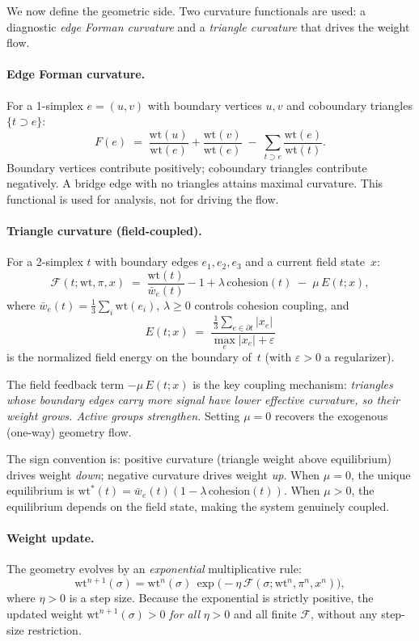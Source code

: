 \documentclass[11pt]{article}
\newcommand{\wt}{\mathrm{wt}}
\newcommand{\Flow}{\mathcal{F}}
\begin{document}
We now define the geometric side.  Two curvature functionals are used: a diagnostic \emph{edge Forman curvature} and a \emph{triangle curvature} that drives the weight flow.

\paragraph{Edge Forman curvature.}
For a 1-simplex $e=(u,v)$ with boundary vertices $u,v$ and coboundary triangles $\{t\supset e\}$:
\begin{equation}\label{eq:edge-forman}
  F(e) \;=\; \frac{\wt(u)}{\wt(e)}+\frac{\wt(v)}{\wt(e)}
         \;-\;\sum_{t\supset e}\frac{\wt(e)}{\wt(t)}.
\end{equation}
Boundary vertices contribute positively; coboundary triangles contribute negatively.  A bridge edge with no triangles attains maximal curvature.  This functional is used for analysis, not for driving the flow.

\paragraph{Triangle curvature (field-coupled).}
For a 2-simplex $t$ with boundary edges $e_1,e_2,e_3$ and a current field state~$x$:
\begin{equation}\label{eq:tri-curv}
  \Flow(t;\wt,\pi,x)
    \;=\; \frac{\wt(t)}{\bar w_e(t)} - 1 + \lambda\,\mathrm{cohesion}(t)
          \;-\;\mu\,E(t;x),
\end{equation}
where $\bar w_e(t)=\tfrac{1}{3}\sum_{i}\wt(e_i)$, $\lambda\ge 0$ controls cohesion coupling, and
\[
  E(t;x) \;=\; \frac{\tfrac{1}{3}\sum_{e\in\partial t}|x_e|}{\max_e|x_e|+\varepsilon}
\]
is the normalized field energy on the boundary of~$t$ (with $\varepsilon>0$ a regularizer).

The field feedback term $-\mu\,E(t;x)$ is the key coupling mechanism: \emph{triangles whose boundary edges carry more signal have lower effective curvature, so their weight grows.  Active groups strengthen.}  Setting $\mu=0$ recovers the exogenous (one-way) geometry flow.

The sign convention is: positive curvature (triangle weight above equilibrium) drives weight \emph{down}; negative curvature drives weight \emph{up}.  When $\mu=0$, the unique equilibrium is $\wt^\ast(t) = \bar w_e(t)(1-\lambda\,\mathrm{cohesion}(t))$.  When $\mu>0$, the equilibrium depends on the field state, making the system genuinely coupled.

\paragraph{Weight update.}
The geometry evolves by an \emph{exponential} multiplicative rule:
\begin{equation}
\wt^{n+1}(\sigma)=\wt^n(\sigma)\,\exp\!\bigl(-\eta \,\Flow(\sigma;\wt^n,\pi^n,x^n)\bigr),
\label{eq:weightupdate}
\end{equation}
where $\eta>0$ is a step size.  Because the exponential is strictly positive, the updated weight $\wt^{n+1}(\sigma)>0$ \emph{for all} $\eta>0$ and all finite $\Flow$, without any step-size restriction.
\end{document}
